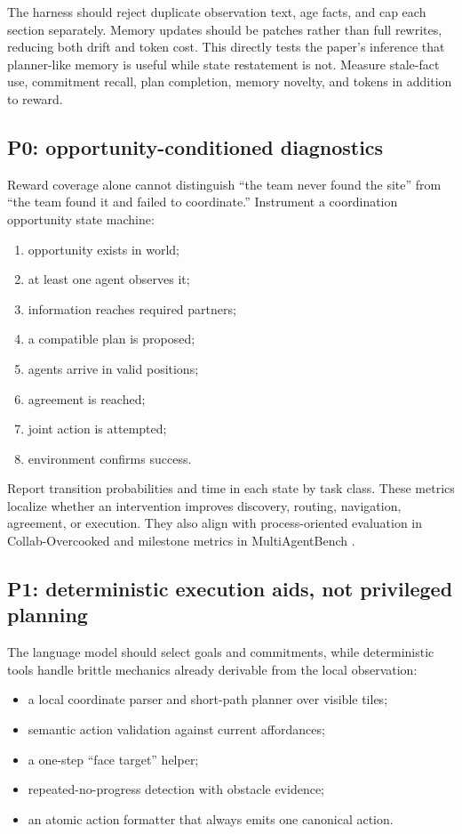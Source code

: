 \documentclass[11pt]{article}
\begin{document}
The harness should reject duplicate observation text, age facts, and cap each section separately.
Memory updates should be patches rather than full rewrites, reducing both drift and token cost.  This
directly tests the paper's inference that planner-like memory is useful while state restatement is not.
Measure stale-fact use, commitment recall, plan completion, memory novelty, and tokens in addition
to reward.

\subsection{P0: opportunity-conditioned diagnostics}

Reward coverage alone cannot distinguish ``the team never found the site'' from ``the team found it
and failed to coordinate.''  Instrument a coordination opportunity state machine:

\begin{enumerate}
  \item opportunity exists in world;
  \item at least one agent observes it;
  \item information reaches required partners;
  \item a compatible plan is proposed;
  \item agents arrive in valid positions;
  \item agreement is reached;
  \item joint action is attempted;
  \item environment confirms success.
\end{enumerate}

Report transition probabilities and time in each state by task class.  These metrics localize whether
an intervention improves discovery, routing, navigation, agreement, or execution.  They also align
with process-oriented evaluation in Collab-Overcooked and milestone metrics in MultiAgentBench
\cite{sun2025collab,zhu2025multiagentbench}.

\subsection{P1: deterministic execution aids, not privileged planning}

The language model should select goals and commitments, while deterministic tools handle brittle
mechanics already derivable from the local observation:

\begin{itemize}
  \item a local coordinate parser and short-path planner over visible tiles;
  \item semantic action validation against current affordances;
  \item a one-step ``face target'' helper;
  \item repeated-no-progress detection with obstacle evidence;
  \item an atomic action formatter that always emits one canonical action.
\end{itemize}
\end{document}
